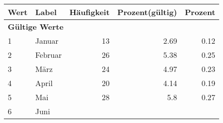      \begin{longtable}{lXrrr}
     \toprule
     \textbf{Wert} & \textbf{Label} & \textbf{Häufigkeit} & \textbf{Prozent(gültig)} & \textbf{Prozent} \\
     \endhead
     \midrule
     \multicolumn{5}{l}{\textbf{Gültige Werte}}\\

     1 &
     \multicolumn{1}{X}{ Januar   } &


       \num{13} &
       \num[round-mode=places,round-precision=2]{2.69} &
         \num[round-mode=places,round-precision=2]{0.12} \\

     2 &
     \multicolumn{1}{X}{ Februar   } &


       \num{26} &
       \num[round-mode=places,round-precision=2]{5.38} &
         \num[round-mode=places,round-precision=2]{0.25} \\

     3 &
     \multicolumn{1}{X}{ März   } &


       \num{24} &
       \num[round-mode=places,round-precision=2]{4.97} &
         \num[round-mode=places,round-precision=2]{0.23} \\

     4 &
     \multicolumn{1}{X}{ April   } &


       \num{20} &
       \num[round-mode=places,round-precision=2]{4.14} &
         \num[round-mode=places,round-precision=2]{0.19} \\

     5 &
     \multicolumn{1}{X}{ Mai   } &


       \num{28} &
       \num[round-mode=places,round-precision=2]{5.8} &
         \num[round-mode=places,round-precision=2]{0.27} \\

     6 &
     \multicolumn{1}{X}{ Juni   } &



\end{longtable}
